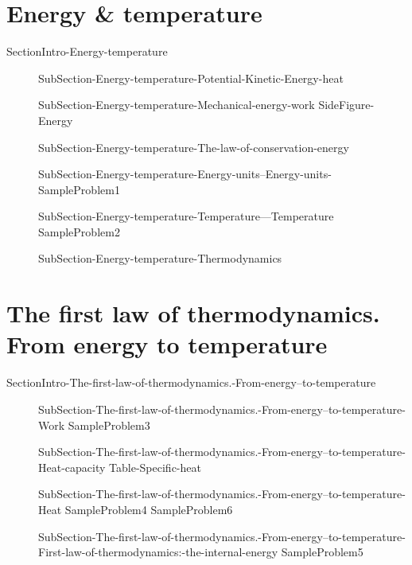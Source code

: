 \documentclass[main.tex]{subfiles}
\newcommand\chapterlabel{Ch-thermochemistry}\setcounter{figurenewcounter}{0}\setcounter{tablenewcounter}{0}\setcounter{formulanewcounter}{0}
\begin{document}
\section{Energy \& temperature}
{SectionIntro-Energy-temperature}
\sloppy\begin{description}
\item[] 
  {SubSection-Energy-temperature-Potential-Kinetic-Energy-heat}
\item[] 
  {SubSection-Energy-temperature-Mechanical-energy-work}
   {SideFigure-Energy}
\item[]
  {SubSection-Energy-temperature-The-law-of-conservation-energy}
\item[] 
  {SubSection-Energy-temperature-Energy-units--Energy-units-}
   {SampleProblem1}
\item[]
  {SubSection-Energy-temperature-Temperature---Temperature}
   {SampleProblem2}
\item[] 
  {SubSection-Energy-temperature-Thermodynamics}
\end{description}

\section{The first law of thermodynamics. From energy  to temperature}
{SectionIntro-The-first-law-of-thermodynamics.-From-energy--to-temperature}
\sloppy\begin{description}
\item[] 
  {SubSection-The-first-law-of-thermodynamics.-From-energy--to-temperature-Work}
   {SampleProblem3}
\item[] 
  {SubSection-The-first-law-of-thermodynamics.-From-energy--to-temperature-Heat-capacity}
   {Table-Specific-heat}
\item[] 
  {SubSection-The-first-law-of-thermodynamics.-From-energy--to-temperature-Heat}
   {SampleProblem4}
      {SampleProblem6}
\item[] 
  {SubSection-The-first-law-of-thermodynamics.-From-energy--to-temperature-First-law-of-thermodynamics:-the-internal-energy}
   {SampleProblem5}

\end{description}
\end{document}
